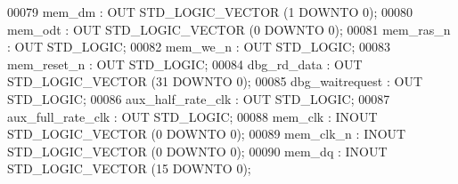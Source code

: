 \begin{DoxyCode}
{00079         \textcolor{vhdlchar}{mem_dm}  \textcolor{vhdlchar}{:} \textcolor{keywordflow}{OUT} \textcolor{comment}{STD\_LOGIC\_VECTOR} \textcolor{vhdlchar}{(}\textcolor{vhdllogic}{}\textcolor{vhdllogic}{1} \textcolor{keywordflow}{DOWNTO} \textcolor{vhdllogic}{}\textcolor{vhdllogic}{0}\textcolor{vhdlchar}{)};
00080         \textcolor{vhdlchar}{mem_odt} \textcolor{vhdlchar}{:} \textcolor{keywordflow}{OUT} \textcolor{comment}{STD\_LOGIC\_VECTOR} \textcolor{vhdlchar}{(}\textcolor{vhdllogic}{}\textcolor{vhdllogic}{0} \textcolor{keywordflow}{DOWNTO} \textcolor{vhdllogic}{}\textcolor{vhdllogic}{0}\textcolor{vhdlchar}{)};
00081         \textcolor{vhdlchar}{mem_ras_n}   \textcolor{vhdlchar}{:} \textcolor{keywordflow}{OUT} \textcolor{comment}{STD\_LOGIC};
00082         \textcolor{vhdlchar}{mem_we_n}    \textcolor{vhdlchar}{:} \textcolor{keywordflow}{OUT} \textcolor{comment}{STD\_LOGIC};
00083         \textcolor{vhdlchar}{mem_reset_n} \textcolor{vhdlchar}{:} \textcolor{keywordflow}{OUT} \textcolor{comment}{STD\_LOGIC};
00084         \textcolor{vhdlchar}{dbg_rd_data} \textcolor{vhdlchar}{:} \textcolor{keywordflow}{OUT} \textcolor{comment}{STD\_LOGIC\_VECTOR} \textcolor{vhdlchar}{(}\textcolor{vhdllogic}{}\textcolor{vhdllogic}{31} \textcolor{keywordflow}{DOWNTO} \textcolor{vhdllogic}{}\textcolor{vhdllogic}{0}\textcolor{vhdlchar}{)};
00085         \textcolor{vhdlchar}{dbg_waitrequest} \textcolor{vhdlchar}{:} \textcolor{keywordflow}{OUT} \textcolor{comment}{STD\_LOGIC};
00086         \textcolor{vhdlchar}{aux_half_rate_clk}   \textcolor{vhdlchar}{:} \textcolor{keywordflow}{OUT} \textcolor{comment}{STD\_LOGIC};
00087         \textcolor{vhdlchar}{aux_full_rate_clk}   \textcolor{vhdlchar}{:} \textcolor{keywordflow}{OUT} \textcolor{comment}{STD\_LOGIC};
00088         \textcolor{vhdlchar}{mem_clk} \textcolor{vhdlchar}{:} \textcolor{keywordflow}{INOUT} \textcolor{comment}{STD\_LOGIC\_VECTOR} \textcolor{vhdlchar}{(}\textcolor{vhdllogic}{}\textcolor{vhdllogic}{0} \textcolor{keywordflow}{DOWNTO} \textcolor{vhdllogic}{}\textcolor{vhdllogic}{0}\textcolor{vhdlchar}{)};
00089         \textcolor{vhdlchar}{mem_clk_n}   \textcolor{vhdlchar}{:} \textcolor{keywordflow}{INOUT} \textcolor{comment}{STD\_LOGIC\_VECTOR} \textcolor{vhdlchar}{(}\textcolor{vhdllogic}{}\textcolor{vhdllogic}{0} \textcolor{keywordflow}{DOWNTO} \textcolor{vhdllogic}{}\textcolor{vhdllogic}{0}\textcolor{vhdlchar}{)};
00090         \textcolor{vhdlchar}{mem_dq}  \textcolor{vhdlchar}{:} \textcolor{keywordflow}{INOUT} \textcolor{comment}{STD\_LOGIC\_VECTOR} \textcolor{vhdlchar}{(}\textcolor{vhdllogic}{}\textcolor{vhdllogic}{15} \textcolor{keywordflow}{DOWNTO} \textcolor{vhdllogic}{}\textcolor{vhdllogic}{0}\textcolor{vhdlchar}{)};
}
\end{DoxyCode}
